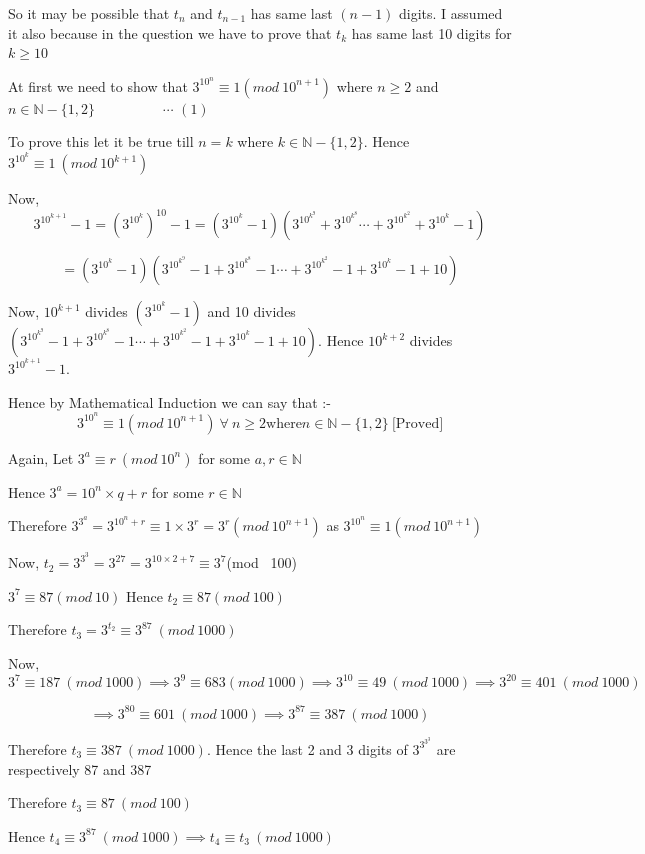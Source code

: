 \documentclass{article}
\begin{document}
\begin{enumerate}
So it may be possible that $t_n$ and $t_{n-1}$ has same last $(n-1)$ digits. I assumed it also because in the question we have to prove that $t_k $ has same last 10 digits for $k\geq 10$

At first we need to show that $3^{10^n} \equiv 1 (mod \ 10^{n+1})$ where $n\geq 2$ and $n\in \mathbb{N}-\{ 1,2\}$ \ \ \  \ \ \ \ \ \ $\cdots$ $(1)$

To prove this let it be true till $n=k$ where $k\in \mathbb{N}-\{ 1,2\}$. Hence $3^{10^k} \equiv 1\ (mod \ 10^{k+1})$

Now, $$3^{10^{k+1}}-1 = \left(3^{10^k} \right)^{10}-1=\left(3^{10^k} -1\right)\left(3^{10^{k^{9}}}+3^{10^{k^{8}}}\cdots + 3^{10^{k^{2}}}+3^{10^{k}} -1\right)$$

$$= \left(3^{10^k}-1\right)\left(3^{10^{k^{9}}}-1+3^{10^{k^{8}}}-1\cdots + 3^{10^{k^{2}}}-1+3^{10^{k}}-1+10\right)$$

Now, $10^{k+1}$ divides $\left(3^{10^k}-1\right)$ and 10 divides $\left(3^{10^{k^{9}}}-1+3^{10^{k^{8}}}-1\cdots + 3^{10^{k^{2}}}-1+3^{10^{k}}-1+10\right) $. Hence $10^{k+2}$ divides $3^{10^{k+1}}-1$.

Hence by Mathematical Induction we can say that :- $$3^{10^n} \equiv 1 (mod \ 10^{n+1}) \ \forall \  n\geq 2 \text{where} n\in \mathbb{N}-\{ 1,2\}\ \text{[Proved]}$$

Again, Let $3^a\equiv r\ (mod \ 10^n)$ for some $a,r\in \mathbb{N}$

Hence $3^a=10^n\times q +r$ for some $r \in \mathbb{N}$

Therefore $3^{3^a}= 3^{10^n + r}\equiv 1\times 3^r = 3^r (mod \ 10^{n+1})$ as $3^{10^n}\equiv 1(mod \ 10^{n+1})$

Now, $t_2=3^{3^3}=3^{27}=3^{10\times 2 +7}\equiv 3^7$(mod \ 100)

$3^7\equiv 87 (mod \ 10)$ Hence $t_2\equiv 87 (mod \ 100)$

Therefore $t_3=3^{t_2}\equiv 3^{87}\ (mod \ 1000)$

Now, $$3^7\equiv 187\ (mod \ 1000) \implies 3^9\equiv 683(mod \ 1000)\implies 3^{10}\equiv 49\ (mod \ 1000)\implies 3^{20}\equiv 401 \ (mod \ 1000)$$

$$ \implies 3^{80}\equiv 601\ (mod \ 1000)\implies 3^{87}\equiv 387\ (mod \ 1000)$$

Therefore $t_3 \equiv 387\ (mod \ 1000)$. Hence the last 2 and 3 digits of $3^{3^{3^3}}$ are respectively 87 and 387

Therefore $t_3 \equiv 87\ (mod \ 100)$

Hence $t_4 \equiv 3^{87}\ (mod \ 1000)\implies t_4\equiv t_3\  (mod \ 1000)$


\end{enumerate}
\end{document}
